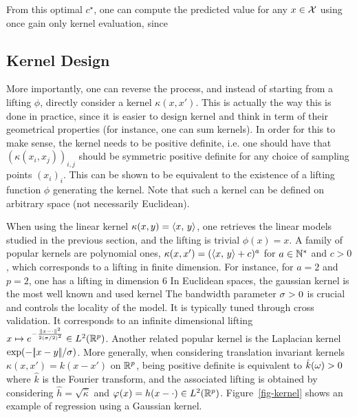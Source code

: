 From this optimal $c^\star$, one can compute the predicted value for any $x \in \mathcal{X}$ using once gain only kernel evaluation, since

\subsection{Kernel Design}

More importantly, one can reverse the process, and instead of starting from a lifting $\phi$, directly consider a kernel $\kappa(x,x')$. This is actually the way this is done in practice, since it is easier to design kernel and think in term of their geometrical properties (for instance, one can sum kernels). In order for this to make sense, the kernel needs to be positive definite, i.e. one should have that $(\kappa(x_i,x_j))_{i,j}$ should be symmetric positive definite for any choice of sampling points $(x_i)_i$. This can be shown to be equivalent to the existence of a lifting function $\phi$ generating the kernel.
%
Note that such a kernel can be defined on arbitrary space (not necessarily Euclidean). 


When using the linear kernel $\kappa(x,y)=\langle x,\,y\rangle$, one retrieves the linear models studied in the previous section, and the lifting is trivial $\phi(x)=x$.
%
A family of popular kernels are polynomial ones,  $\kappa(x,x') = (\langle x,\,y\rangle+c)^a$ for $a
\in \mathbb{N}^*$ and $c>0$, which corresponds to a lifting in finite dimension. For instance, for $a=2$ and $p=2$, one has a lifting in dimension $6$
In Euclidean spaces, the gaussian kernel is the most well known and used kernel
The bandwidth parameter $\sigma>0$ is crucial and controls the locality of
the model. It is typically tuned through cross validation. It corresponds to an infinite dimensional lifting $x \mapsto e^{-\frac{|\!| x-\cdot |\!|^2}{2(\sigma/2)^2}} \in L^2(\mathbb{R}^p)$.
%
Another related popular kernel is the Laplacian kernel $\exp(-|\!| x-y |\!|/\sigma)$.
%
More generally, when considering translation invariant kernels $\kappa(x,x') = k(x-x')$ on $\mathbb{R}^p$, being positive definite is equivalent to $\hat k(\omega)>0$ where $\hat k$ is the Fourier transform, and the associated lifting is obtained by considering $\hat h=\sqrt{\hat \kappa}$ and $\varphi(x)=h(x-\cdot) \in L^2(\mathbb{R}^p)$. 
%
Figure~\ref{fig-kernel} shows an example of regression using a Gaussian kernel. 



